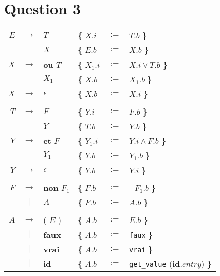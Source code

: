 \documentclass[class=article]{standalone}
\begin{document}
\section*{Question 3}

\begin{center}
  \begin{tabular}{rcllcl}

      $E$ & $\rightarrow$ & $T$          &{\bf\{} $X.i$   & $:=$ & $T.b$ {\bf\}}\\
          &               & $X$          &{\bf\{} $E.b$   & $:=$ & $X.b$ {\bf\}}\\
      $X$ & $\rightarrow$ & {\bf ou} $T$ &{\bf\{} $X_1.i$ & $:=$ & $X.i \vee T.b$ {\bf\}}\\
          &               & $X_1$        &{\bf\{} $X.b$   & $:=$ & $X_1.b$ {\bf\}}\\
      $X$ & $\rightarrow$ & $\epsilon$   &{\bf\{} $X.b$   & $:=$ & $X.i$ {\bf\}}\\
      \\
      $T$ & $\rightarrow$ & $F$          &{\bf\{} $Y.i$   & $:=$ & $F.b$ {\bf\}}\\
          &               & $Y$          &{\bf\{} $T.b$   & $:=$ & $Y.b$ {\bf\}}\\
      $Y$ & $\rightarrow$ & {\bf et} $F$ &{\bf\{} $Y_1.i$ & $:=$ & $Y.i \wedge F.b$ {\bf\}}\\
          &               & $Y_1$        &{\bf\{} $Y.b$   & $:=$ & $Y_1.b$ {\bf\}}\\
      $Y$ & $\rightarrow$ & $\epsilon$   &{\bf\{} $Y.b$   & $:=$ & $Y.i$ {\bf\}}\\
      \\
      $F$ & $\rightarrow$ & {\bf non} $F_1$    & {\bf\{} $F.b$ & $:=$ & $\neg F_1.b$ {\bf\}}\\
          & $|$           & $A$                & {\bf\{} $F.b$ & $:=$ & $A.b$ {\bf\}}\\
      \\
      $A$ & $\rightarrow$ & ( $E$ )            & {\bf\{} $A.b$ & $:=$ & $E.b$ {\bf\}}\\
          & $|$           & {\bf faux}         & {\bf\{} $A.b$ & $:=$ & \lstinline[]$faux$  {\bf\}}\\
          & $|$           & {\bf vrai}         & {\bf\{} $A.b$ & $:=$ & \lstinline[]$vrai$  {\bf\}}\\
          & $|$           & {\bf id}           & {\bf\{} $A.b$ & $:=$ & \lstinline[]$get_value$ ({\bf id}$.entry$) {\bf\}}\\
  \end{tabular}
\end{center}
\end{document}
